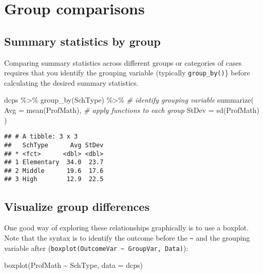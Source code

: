 \documentclass[
  12pt,
]{krantz}
\newenvironment{Shaded}{\begin{snugshade}}{\end{snugshade}}
\newcommand{\AttributeTok}[1]{\textcolor[rgb]{0.77,0.63,0.00}{#1}}
\newcommand{\CommentTok}[1]{\textcolor[rgb]{0.56,0.35,0.01}{\textit{#1}}}
\newcommand{\FunctionTok}[1]{\textcolor[rgb]{0.00,0.00,0.00}{#1}}
\newcommand{\NormalTok}[1]{#1}
\newcommand{\SpecialCharTok}[1]{\textcolor[rgb]{0.00,0.00,0.00}{#1}}
\begin{document}
\hypertarget{group-comparisons}{%
\section{Group comparisons}\label{group-comparisons}}

\hypertarget{summary-statistics-by-group}{%
\subsection{Summary statistics by group}\label{summary-statistics-by-group}}

Comparing summary statistics across different groups or categories of cases requires that you identify the grouping variable (typically \texttt{group\_by()}\} before calculating the desired summary statistics.

\begin{Shaded}
\begin{Highlighting}[]
\NormalTok{  dcps }\SpecialCharTok{\%\textgreater{}\%}
    \FunctionTok{group\_by}\NormalTok{(SchType) }\SpecialCharTok{\%\textgreater{}\%}  \CommentTok{\# identify grouping variable}
    \FunctionTok{summarize}\NormalTok{(}
      \AttributeTok{Avg =} \FunctionTok{mean}\NormalTok{(ProfMath),  }\CommentTok{\# apply functions to each group}
      \AttributeTok{StDev =} \FunctionTok{sd}\NormalTok{(ProfMath)}
\NormalTok{    )}
\end{Highlighting}
\end{Shaded}

\begin{verbatim}
## # A tibble: 3 x 3
##   SchType      Avg StDev
## * <fct>      <dbl> <dbl>
## 1 Elementary  34.0  23.7
## 2 Middle      19.6  17.6
## 3 High        12.9  22.5
\end{verbatim}

\hypertarget{visualize-group-differences}{%
\subsection{Visualize group differences}\label{visualize-group-differences}}

One good way of exploring these relationships graphically is to use a boxplot. Note that the syntax is to identify the outcome before the \texttt{\textasciitilde{}} and the grouping variable after (\texttt{boxplot(OutcomeVar\ \textasciitilde{}\ GroupVar,\ Data)}):

\begin{Shaded}
\begin{Highlighting}[]
  \FunctionTok{boxplot}\NormalTok{(ProfMath }\SpecialCharTok{\textasciitilde{}}\NormalTok{ SchType, }\AttributeTok{data =}\NormalTok{ dcps)}
\end{Highlighting}
\end{Shaded}
\end{document}
